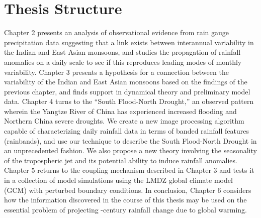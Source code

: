 \section{Thesis Structure}

Chapter 2 presents an analysis of observational evidence from rain gauge precipitation data suggesting that a link exists between interannual variability in the Indian and East Asian monsoons, and studies the propagation of rainfall anomalies on a daily scale to see if this reproduces leading modes of monthly variability. Chapter 3 presents a hypothesis for a connection between the variability of the Indian and East Asian monsoons based on the findings of the previous chapter, and finds support in dynamical theory and preliminary model data. Chapter 4 turns to the ``South Flood-North Drought,'' an observed pattern wherein the Yangtze River of China has experienced increased flooding and Northern China severe droughts. We create a new image processing algorithm capable of characterizing daily rainfall data in terms of banded rainfall features (rainbands), and use our technique to describe the South Flood-North Drought in an unprecedented fashion. We also propose a new theory involving the seasonality of the tropospheric jet and its potential ability to induce rainfall anomalies. Chapter 5 returns to the coupling mechanism described in Chapter 3 and tests it in a collection of model simulations using the LMDZ global climate model (GCM) with perturbed boundary conditions. In conclusion, Chapter 6 considers how the information discovered in the course of this thesis may be used on the essential problem of projecting -century rainfall change due to global warming.